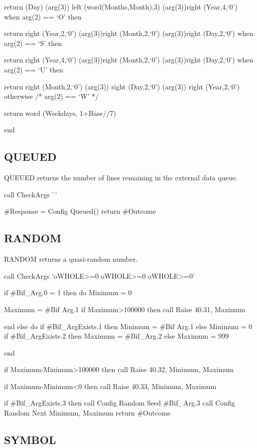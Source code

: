 return (Day) (arg(3)) left (word(Months,Month),3) (arg(3))right
(Year,4,`0') when arg(2) == `O' then

return right (Year,2,`0') (arg(3))right (Month,2,`0') (arg(3))right
(Day,2,`0') when arg(2) == `S' then

return right (Year,4,`0') (arg(3))right (Month,2,`0') (arg(3))right
(Day,2,`0') when arg(2) == `U' then

return right (Month,2,`0') (arg(3)) right (Day,2,`0') (arg(3)) right
(Year,2,`0') otherwise /* arg(2) == `W' */

return word (Weekdays, 1+Base//7)

end

\subsection{QUEUED}\label{queued}

QUEUED returns the number of lines remaining in the external data queue.

call CheckArgs '\,'

\#Response = Config Queued() return \#Outcome

\subsection{RANDOM}\label{random}

RANDOM returns a quasi-random number.

call CheckArgs `oWHOLE\textgreater=0 oWHOLE\textgreater=0
oWHOLE\textgreater=0'

if \#Bif\_Arg.0 = 1 then do Minimum = 0

Maximum = \#Bif Arg.1 if Maximum\textgreater100000 then call Raise
40.31, Maximum

end else do if \#Bif\_ArgExists.1 then Minimum = \#Bif Arg.1 else
Minimum = 0 if \#Bif\_ArgExists.2 then Maximum = \#Bif\_Arg.2 else
Maximum = 999

end

if Maximum-Minimum\textgreater100000 then call Raise 40.32, Minimum,
Maximum

if Maximum-Minimum\textless0 then call Raise 40.33, Minimum, Maximum

if \#Bif\_ArgExists.3 then call Config Random Seed \#Bif\_Arg.3 call
Config Random Next Minimum, Maximum return \#Outcome

\subsection{SYMBOL}\label{symbol}


